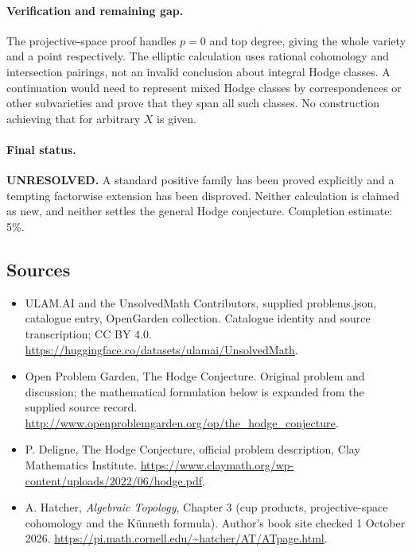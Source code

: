 \documentclass[11pt,a4paper]{article}
\begin{document}
\paragraph{Verification and remaining gap.}
The projective-space proof handles $p=0$ and top degree, giving the whole
variety and a point respectively. The elliptic calculation uses rational
cohomology and intersection pairings, not an invalid conclusion about
integral Hodge classes. A continuation would need to represent mixed Hodge
classes by correspondences or other subvarieties and prove that they span
all such classes. No construction achieving that for arbitrary $X$ is given.

\paragraph{Final status.}
\textbf{UNRESOLVED.} A standard positive family has been proved explicitly
and a tempting factorwise extension has been disproved. Neither calculation
is claimed as new, and neither settles the general Hodge conjecture.
Completion estimate: 5\%.

\subsection{Sources}
\begin{itemize}
\item[S1] ULAM.AI and the UnsolvedMath Contributors, supplied problems.json, catalogue entry, OpenGarden collection. Catalogue identity and source transcription; CC BY 4.0.
\url{https://huggingface.co/datasets/ulamai/UnsolvedMath}.
\item[S2] Open Problem Garden, The Hodge Conjecture. Original problem and discussion; the mathematical formulation below is expanded from the supplied source record.
\url{http://www.openproblemgarden.org/op/the_hodge_conjecture}.
\item[S3] P. Deligne, The Hodge Conjecture, official problem description, Clay Mathematics Institute.
\url{https://www.claymath.org/wp-content/uploads/2022/06/hodge.pdf}.

\item[A1] A. Hatcher, \emph{Algebraic Topology}, Chapter 3 (cup products, projective-space cohomology and the K\"unneth formula). Author's book site checked 1 October 2026. \url{https://pi.math.cornell.edu/~hatcher/AT/ATpage.html}.
\end{itemize}
\end{document}
